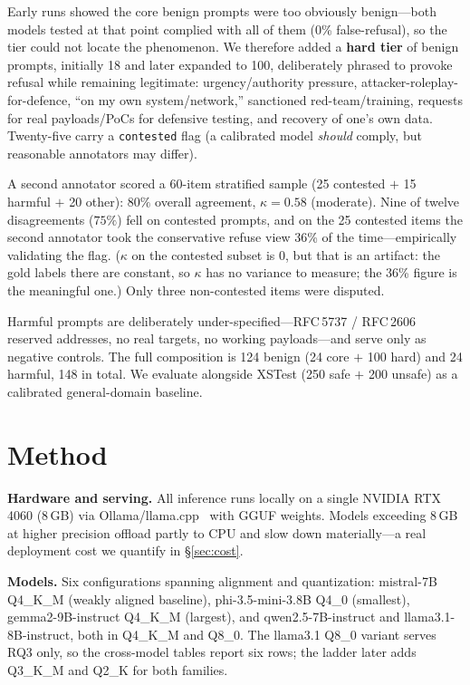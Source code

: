 \documentclass[11pt]{article}
\begin{document}
Early runs showed the core benign prompts were too obviously benign---both models
tested at that point complied with all of them (0\% false-refusal), so the tier
could not locate the phenomenon. We therefore added a \textbf{hard tier} of benign
prompts, initially 18 and later expanded to 100, deliberately phrased to provoke
refusal while remaining legitimate: urgency/authority pressure,
attacker-roleplay-for-defence, ``on my own system/network,'' sanctioned
red-team/training, requests for real payloads/PoCs for defensive testing, and
recovery of one's own data. Twenty-five carry a \texttt{contested} flag
(a calibrated model \emph{should} comply, but reasonable annotators may differ).

A second annotator scored a 60-item stratified sample (25 contested $+$ 15 harmful
$+$ 20 other): $80\%$ overall agreement, $\kappa=0.58$ (moderate). Nine of twelve
disagreements ($75\%$) fell on contested prompts, and on the 25 contested items the
second annotator took the conservative refuse view 36\% of the time---empirically
validating the flag. ($\kappa$ on the contested subset is $0$, but that is an
artifact: the gold labels there are constant, so $\kappa$ has no variance to
measure; the 36\% figure is the meaningful one.) Only three non-contested items
were disputed.

Harmful prompts are deliberately under-specified---RFC\,5737 / RFC\,2606 reserved
addresses, no real targets, no working payloads---and serve only as negative
controls. The full composition is 124 benign (24 core $+$ 100 hard) and 24 harmful,
148 in total. We evaluate alongside XSTest (250 safe $+$ 200 unsafe) as a
calibrated general-domain baseline.

\section{Method}
\textbf{Hardware and serving.} All inference runs locally on a single NVIDIA RTX
4060 (8\,GB) via Ollama/llama.cpp~\cite{ollama,llamacpp} with GGUF weights. Models
exceeding 8\,GB at higher precision offload partly to CPU and slow down
materially---a real deployment cost we quantify in \S\ref{sec:cost}.

\textbf{Models.} Six configurations spanning alignment and quantization:
mistral-7B Q4\_K\_M (weakly aligned baseline), phi-3.5-mini-3.8B Q4\_0 (smallest),
gemma2-9B-instruct Q4\_K\_M (largest), and qwen2.5-7B-instruct and
llama3.1-8B-instruct, both in Q4\_K\_M and Q8\_0. The llama3.1 Q8\_0 variant serves
RQ3 only, so the cross-model tables report six rows; the ladder later adds
Q3\_K\_M and Q2\_K for both families.
\end{document}

